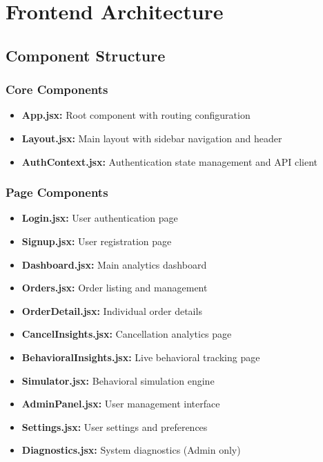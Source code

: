 \documentclass[12pt,a4paper]{article}
\begin{document}
\newpage

\section{Frontend Architecture}


\subsection{Component Structure}

\subsubsection{Core Components}
\begin{itemize}[leftmargin=*]
    \item \textbf{App.jsx:} Root component with routing configuration
    \item \textbf{Layout.jsx:} Main layout with sidebar navigation and header
    \item \textbf{AuthContext.jsx:} Authentication state management and API client
\end{itemize}

\subsubsection{Page Components}
\begin{itemize}[leftmargin=*]
    \item \textbf{Login.jsx:} User authentication page
    \item \textbf{Signup.jsx:} User registration page
    \item \textbf{Dashboard.jsx:} Main analytics dashboard
    \item \textbf{Orders.jsx:} Order listing and management
    \item \textbf{OrderDetail.jsx:} Individual order details
    \item \textbf{CancelInsights.jsx:} Cancellation analytics page
    \item \textbf{BehavioralInsights.jsx:} Live behavioral tracking page
    \item \textbf{Simulator.jsx:} Behavioral simulation engine
    \item \textbf{AdminPanel.jsx:} User management interface
    \item \textbf{Settings.jsx:} User settings and preferences
    \item \textbf{Diagnostics.jsx:} System diagnostics (Admin only)
\end{itemize}
\end{document}
